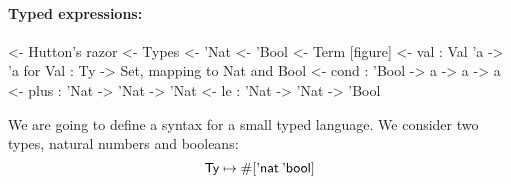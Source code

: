 \paragraph{Typed expressions:}

\begin{wstructure}
<- Hutton's razor
    <- Types
        <- 'Nat
        <- 'Bool
    <- Term [figure]
        <- val : Val 'a -> 'a  for Val : Ty -> Set, mapping to Nat and Bool
        <- cond : 'Bool -> a -> a -> a
        <- plus : 'Nat -> 'Nat -> 'Nat
        <- le : 'Nat -> 'Nat -> 'Bool
\end{wstructure}

\newcommand{\Ty}{\D{Ty}}
\newcommand{\Ebool}{\etag{\CN{bool}}}
\newcommand{\Enat}{\etag{\CN{nat}}}

\newcommand{\SYMBEval}{\etag{\CN{val}}\xspace}
\newcommand{\Eval}[1]{\SYMBEval\:#1}
\newcommand{\SYMBEcond}{\etag{\CN{cond}}\xspace}
\newcommand{\Econd}[3]{\SYMBEcond\:#1\:#2\:#3}
\newcommand{\SYMBEplus}{\etag{\CN{plus}}\xspace}
\newcommand{\Eplus}[2]{\SYMBEplus\:#1\:#2}
\newcommand{\SYMBEle}{\etag{\CN{le}}\xspace}
\newcommand{\Ele}[2]{\SYMBEle\:#1\:#2}

\newcommand{\SYMBVal}{\F{Val}\xspace}
\newcommand{\Val}[1]{\SYMBVal\:#1}
\newcommand{\SYMBVar}{\F{Var}\xspace}
\newcommand{\Var}[2]{\SYMBVar\: #1\: #2}

\newcommand{\HExprD}{\C{ExprD}}
\newcommand{\HExprAD}{\C{ExprAD}}
\newcommand{\HExprID}{\C{ExprID}}
\newcommand{\HExprVarD}[1]{\C{ExprD}_{\F{Var},#1}}
\newcommand{\HExprFreeD}{\C{ExprD}^{\C{Free}}}
\newcommand{\HExprAFreeD}{\C{ExprAD}^{\C{Free}}}

We are going to define a syntax for a small typed language. We
consider two types, natural numbers and booleans:
%
\[
\Ty \mapsto \EnumT{\sqr{\Enat\: \Ebool}}
\]

